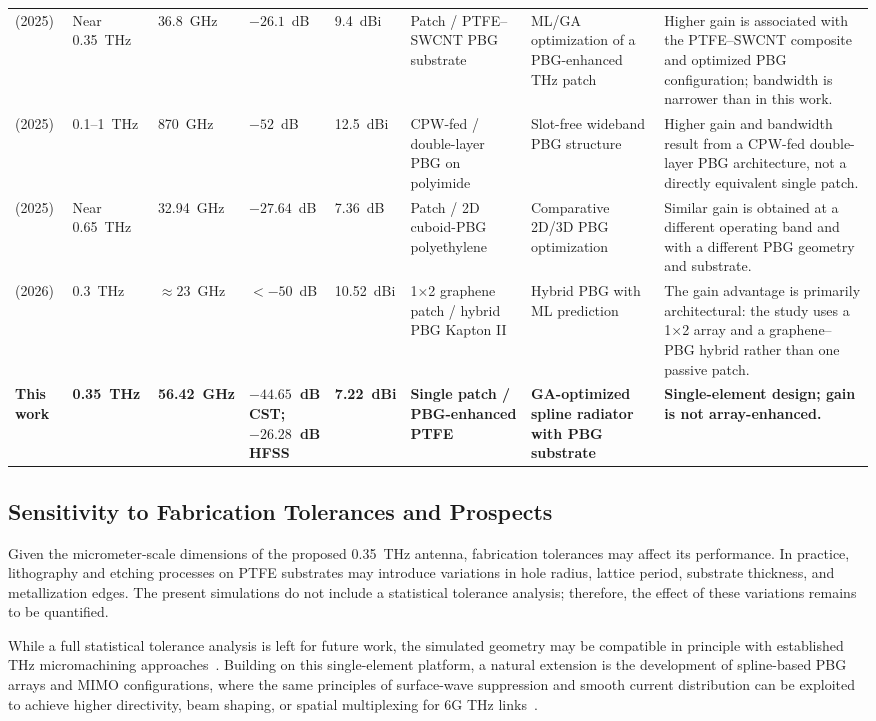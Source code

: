 \documentclass[draft]{agujournal2019}
\begin{document}
\begin{table}[t]
\begin{tabularx}{\linewidth}{@{}M{2.2cm}C{1.35cm}C{1.1cm}C{1.2cm}C{1.1cm}M{2.0cm}M{2.2cm}M{3.0cm}@{}}
\cite{babaahmed_hybrid_2025} (2025) & Near 0.35~THz & 36.8~GHz & $-26.1$~dB & 9.4~dBi & Patch / PTFE--SWCNT PBG substrate & ML/GA optimization of a PBG-enhanced THz patch & Higher gain is associated with the PTFE--SWCNT composite and optimized PBG configuration; bandwidth is narrower than in this work. \\
\cite{boujmil_pbg_2025} (2025) & 0.1--1~THz & 870~GHz & $-52$~dB & 12.5~dBi & CPW-fed / double-layer PBG on polyimide & Slot-free wideband PBG structure & Higher gain and bandwidth result from a CPW-fed double-layer PBG architecture, not a directly equivalent single patch. \\
\cite{bouzid_pbg_2025} (2025) & Near 0.65~THz & 32.94~GHz & $-27.64$~dB & 7.36~dB & Patch / 2D cuboid-PBG polyethylene & Comparative 2D/3D PBG optimization & Similar gain is obtained at a different operating band and with a different PBG geometry and substrate. \\
\cite{reguig_pbg_ml_2026} (2026) & 0.3~THz & $\approx23$~GHz & $<-50$~dB & 10.52~dBi & 1$\times$2 graphene patch / hybrid PBG Kapton II & Hybrid PBG with ML prediction & The gain advantage is primarily architectural: the study uses a 1$\times$2 array and a graphene--PBG hybrid rather than one passive patch. \\
\midrule
\textbf{This work} & \textbf{0.35~THz} & \textbf{56.42~GHz} & \textbf{$-44.65$~dB CST; $-26.28$~dB HFSS} & \textbf{7.22~dBi} & \textbf{Single patch / PBG-enhanced PTFE} & \textbf{GA-optimized spline radiator with PBG substrate} & \textbf{Single-element design; gain is not array-enhanced.} \\
\bottomrule
\end{tabularx}
\end{table}


\subsection{Sensitivity to Fabrication Tolerances and Prospects}
\label{subsec:tolerances}

Given the micrometer-scale dimensions of the proposed 0.35~THz antenna, fabrication tolerances may affect its performance. In practice, lithography and etching processes on PTFE substrates may introduce variations in hole radius, lattice period, substrate thickness, and metallization edges. The present simulations do not include a statistical tolerance analysis; therefore, the effect of these variations remains to be quantified.

While a full statistical tolerance analysis is left for future work, the simulated geometry may be compatible in principle with established THz micromachining approaches~\cite{he_overview_2020,hajiyat_antenna_2021}. Building on this single-element platform, a natural extension is the development of spline-based PBG arrays and MIMO configurations, where the same principles of surface-wave suppression and smooth current distribution can be exploited to achieve higher directivity, beam shaping, or spatial multiplexing for 6G THz links~\cite{nirob_grid_2025,mousa_ebg_2026}.
\end{document}
